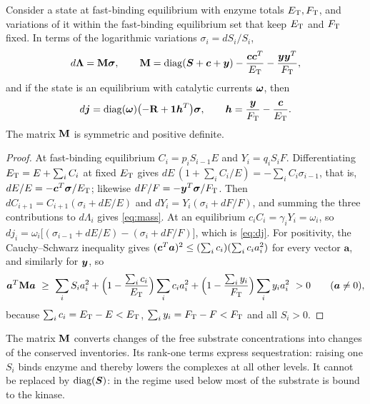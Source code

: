 \begin{lemma}\label{lem:mass}
Consider a state at fast-binding equilibrium with enzyme totals \(E_{\mathrm T},F_{\mathrm T}\), and variations of
it within the fast-binding equilibrium set that keep \(E_{\mathrm T}\) and \(F_{\mathrm T}\) fixed. In terms of
the logarithmic variations \(\sigma_i=dS_i/S_i\),
\begin{equation}\label{eq:mass}
 d\boldsymbol\Lambda=\mathbf M\boldsymbol\sigma,\qquad
 \mathbf M=\operatorname{diag}(\boldsymbol S+\boldsymbol c+\boldsymbol y)-\frac{\boldsymbol c\boldsymbol c^{T}}{E_{\mathrm T}}-\frac{\boldsymbol y\boldsymbol y^{T}}{F_{\mathrm T}},
\end{equation}
and if the state is an equilibrium with catalytic currents \(\boldsymbol\omega\), then
\begin{equation}\label{eq:dj}
 d\boldsymbol j=\operatorname{diag}(\boldsymbol\omega)\bigl(-\mathbf R+\boldsymbol 1\boldsymbol h^{T}\bigr)\boldsymbol\sigma,\qquad
 \boldsymbol h=\frac{\boldsymbol y}{F_{\mathrm T}}-\frac{\boldsymbol c}{E_{\mathrm T}}.
\end{equation}
The matrix \(\mathbf M\) is symmetric and positive definite.
\end{lemma}
\begin{proof}
At fast-binding equilibrium \(C_i=p_iS_{i-1}E\) and \(Y_i=q_iS_iF\). Differentiating
\(E_{\mathrm T}=E+\sum_iC_i\) at fixed \(E_{\mathrm T}\) gives \(dE\,(1+\sum_iC_i/E)=-\sum_iC_i\sigma_{i-1}\), that
is, \(dE/E=-\boldsymbol c^{T}\boldsymbol\sigma/E_{\mathrm T}\); likewise \(dF/F=-\boldsymbol y^{T}\boldsymbol\sigma/F_{\mathrm T}\). Then
\(dC_{i+1}=C_{i+1}(\sigma_i+dE/E)\) and \(dY_i=Y_i(\sigma_i+dF/F)\), and summing the three
contributions to \(d\Lambda_i\) gives \eqref{eq:mass}. At an equilibrium
\(c_iC_i=\gamma_iY_i=\omega_i\), so
\(dj_i=\omega_i\bigl[(\sigma_{i-1}+dE/E)-(\sigma_i+dF/F)\bigr]\), which is \eqref{eq:dj}. For
positivity, the Cauchy--Schwarz inequality gives
\((\boldsymbol c^{T}\boldsymbol a)^2\le(\sum_ic_i)(\sum_ic_ia_i^2)\) for every vector \(\boldsymbol a\),
and similarly for \(\boldsymbol y\), so
\[
 \boldsymbol a^{T}\bM\boldsymbol a\ \ge\ \sum_iS_ia_i^2
 +\Bigl(1-\frac{\sum_ic_i}{\ET}\Bigr)\sum_ic_ia_i^2
 +\Bigl(1-\frac{\sum_iy_i}{\FT}\Bigr)\sum_iy_ia_i^2\ >0\qquad(\boldsymbol a\ne0),
\]
because \(\sum_ic_i=E_{\mathrm T}-E<E_{\mathrm T}\), \(\sum_iy_i=F_{\mathrm T}-F<F_{\mathrm T}\) and all \(S_i>0\).
\end{proof}

The matrix \(\mathbf M\) converts changes of the free substrate concentrations into changes of the
conserved inventories. Its rank-one terms express sequestration: raising one \(S_i\) binds
enzyme and thereby lowers the complexes at all other levels. It cannot be replaced by
\(\operatorname{diag}(\boldsymbol S)\): in the regime used below most of the substrate is bound to the kinase.

